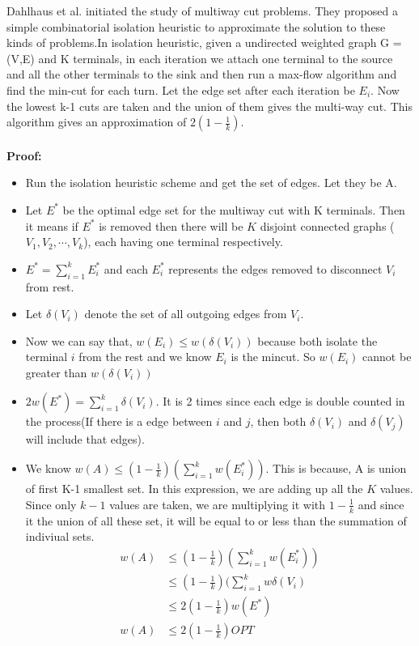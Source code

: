 \documentclass[11pt]{article}
\begin{document}
Dahlhaus et al.\cite{Dahlhaus} initiated the study of multiway cut problems. They proposed a simple combinatorial isolation heuristic to approximate the solution to these kinds of problems.In isolation heuristic, given a undirected weighted graph G = (V,E) and K terminals, in each iteration we attach one terminal to the source and all the other terminals to the sink and then run a max-flow algorithm and find the min-cut for each turn. Let the edge set after each iteration be $E_i$. Now the lowest k-1 cuts are taken and the union of them gives the multi-way cut. This algorithm gives an approximation of $2(1-\frac{1}{k})$.\\\\
\newpage
\textbf{Proof:}
\begin{itemize}
    \item Run the isolation heuristic scheme and get the set of edges. Let they be A.
    \item Let $E^*$ be the optimal edge set for the multiway cut with K terminals. Then it means if $E^*$ is removed then there will be $K$ disjoint connected graphs ($V_1, V_2,\cdots,V_k$), each having one terminal respectively.
    \item $E^* = \sum\limits_{i=1}^{k}{E_i^*}$ and each $E_i^*$ represents the edges removed to disconnect $V_i$ from rest.
    \item Let $\delta(V_i)$ denote the set of all outgoing edges from $V_i$.
    \item Now we can say that, $w(E_i) \le w(\delta(V_i))$ because both isolate the terminal $i$ from the rest and we know $E_i$ is the mincut. So $w(E_i)$ cannot be greater than $w(\delta(V_i))$
    \item $2w(E^*) = \sum\limits_{i=1}^{k}{\delta(V_i)} $. It is 2 times since each edge is double counted in the process(If there is a edge between $i$ and $j$, then both $\delta(V_i)$ and $\delta(V_j)$ will include that edges).
    \item We know $w(A) \le (1 -\frac{1}{k})(\sum\limits_{i=1}^k w(E_i^*))$. This is because, A is union of first K-1 smallest set. In this expression, we are adding up all the $K$ values. Since only $k-1$ values are taken, we are multiplying it with $1 - \frac{1}{k}$ and since it the union of all these set, it will be equal to or less than the summation of indiviual sets.
        \begin{align*}
            w(A) &\le (1 -\frac{1}{k})(\sum\limits_{i=1}^k w(E_i^*)) \\
            &\le (1 -\frac{1}{k})(\sum\limits_{i=1}^k w{\delta(V_i)}\\
            &\le 2(1 -\frac{1}{k})w(E^*)\\
          w(A)  &\le 2(1 -\frac{1}{k}) OPT
        \end{align*}
\end{itemize}
\end{document}
